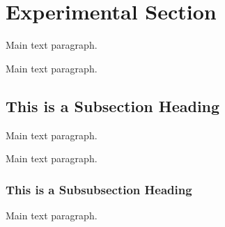 \section{Experimental Section}


Main text paragraph.


Main text paragraph.


\subsection{This is a Subsection Heading}


Main text paragraph.


Main text paragraph.


\subsubsection{This is a Subsubsection Heading}


Main text paragraph.

